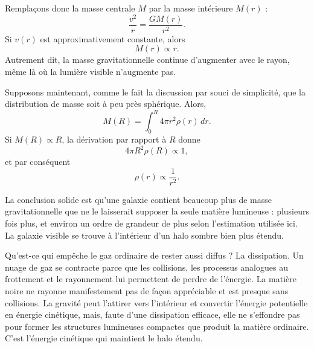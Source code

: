 Remplaçons donc la masse centrale \(M\) par la masse intérieure \(M(r)\) :
\begin{equation}
\frac{v^2}{r}=\frac{G M(r)}{r^2}.
\end{equation}
Si \(v(r)\) est approximativement constante, alors
\begin{equation}
M(r)\propto r.
\end{equation}
Autrement dit, la masse gravitationnelle continue d’augmenter avec le rayon, même là où la lumière visible n’augmente pas.

Supposons maintenant, comme le fait la discussion par souci de simplicité, que la distribution de masse soit à peu près sphérique. Alors,
\begin{equation}
M(R)=\int_0^R 4\pi r^2\rho(r)\,dr.
\end{equation}
Si \(M(R)\propto R\), la dérivation par rapport à \(R\) donne
\begin{equation}
4\pi R^2\rho(R)\propto 1,
\end{equation}
et par conséquent
\begin{equation}
\rho(r)\propto \frac{1}{r^2}.
\end{equation}

\begin{classroomqa}
\end{classroomqa}

La conclusion solide est qu’une galaxie contient beaucoup plus de masse gravitationnelle que ne le laisserait supposer la seule matière lumineuse : plusieurs fois plus, et environ un ordre de grandeur de plus selon l’estimation utilisée ici. La galaxie visible se trouve à l’intérieur d’un halo sombre bien plus étendu.

Qu’est-ce qui empêche le gaz ordinaire de rester aussi diffus ? La dissipation. Un nuage de gaz se contracte parce que les collisions, les processus analogues au frottement et le rayonnement lui permettent de perdre de l’énergie. La matière noire ne rayonne manifestement pas de façon appréciable et est presque sans collisions. La gravité peut l’attirer vers l’intérieur et convertir l’énergie potentielle en énergie cinétique, mais, faute d’une dissipation efficace, elle ne s’effondre pas pour former les structures lumineuses compactes que produit la matière ordinaire. C’est l’énergie cinétique qui maintient le halo étendu.


